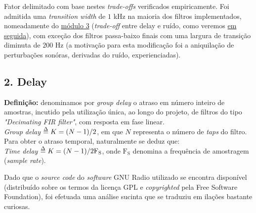 Fator delimitado com base nestes \textit{trade-offs} verificados empiricamente.
\newline\break
\noindent{}
\newline\break
Foi admitida uma \textit{transition width} de $1$ kHz na maioria dos filtros implementados, nomeadamente do \hyperref[subsec:mod3]{módulo 3} (\textit{trade-off} entre delay e ruído, como veremos \hyperref[subsec:delay]{em seguida}), com exceção dos filtros passa-baixo finais com uma largura de transição diminuta de $200$ Hz (a motivação para esta modificação foi a aniquilação de perturbações sonóras, derivadas do ruído, experienciadas).
\subsection{2. Delay}
\label{subsec:delay}
\textbf{Definição:} denominamos por \textit{group delay} o atraso em número inteiro de amostras, incutido pela utilização única, ao longo do projeto, de filtros do tipo \textit{"Decimating FIR filter"}, com resposta em fase linear. \\ \textit{Group delay}\cite{jayesparmarja} $\delequal K = (N-1)/2$, em que $N$ representa o número de \textit{taps} do filtro. Para obter o atraso temporal, naturalmente se deduz que: \\ \textit{Time delay}\cite{jayesparmarja} $\delequal K = (N-1)/2\text{F}_\text{S}$, onde $\text{F}_\text{S}$ denomina a frequência de amostragem (\textit{sample rate}).
\newline\break
\noindent{}
\newline\break

Dado que o \textit{source code} do \textit{software} GNU Radio utilizado se encontra disponível (distribuído sobre os termos da licença GPL e \textit{copyrighted} pela Free Software Foundation), foi efetuada uma análise sucinta que se traduziu em ilações bastante curiosas.

